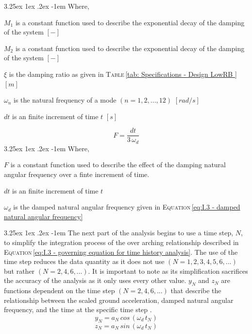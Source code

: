 \documentclass[11pt,a4paper,titlepage]{report}
\makeatletter
\renewcommand\paragraph{\@startsection{paragraph}{5}{\z@}%
  {3.25ex \@plus1ex \@minus.2ex}%
  {-1em}%
  {\normalfont\normalsize\bfseries}}
\makeatother
\begin{document}
\paragraph{}Where,
\begin{itemize}
\begin{small}
    \item $M_1$ is a constant function used to describe the exponential decay of the damping of the system $[-]$
    \item $M_2$ is a constant function used to describe the exponential decay of the damping of the system $[-]$
    \item $\xi$ is the damping ratio as given in \textsc{Table}\,\ref{tab: Specifications - Design LowRB } $[m]$
     \item $\omega_n$ is the natural frequency of a mode $(n=1,2,...,12)$ $[rad/s]$
    \item $dt$ is an finite increment of time $t$ $[s]$
\end{small}
\end{itemize}
\begin{equation}
    F=\dfrac{dt}{3\,\omega_d}
\end{equation}
\paragraph{}Where,
\begin{itemize}
\begin{small}
    \item $F$ is a constant function used to describe the effect of the damping natural angular frequency over a finte increment of time.
    \item $dt$ is an finite increment of time $t$
    \item $\omega_d$ is the damped natural angular frequency given in \textsc{Equation}\,\eqref{eq:I.3 - damped natural angular frequency}
\end{small}
\end{itemize}
\paragraph{}The next part of the analysis begins to use a time step, $N$, to simplify the integration process of the over arching relationship described in \textsc{Equation}\,\eqref{eq:I.3 - governing equation for time history analysis}. The use of the time step reduces the data quantity as it does not use $(N=1,2,3,4,5,6,...)$ but rather $(N=2,4,6,...)$. It is important to note as its simplification sacrifices the accuracy of the analysis as it only uses every other value.  $y_N$ and $z_N$ are functions dependent on the time step $(N=2,4,6,...)$ that describe the relationship between the scaled ground acceleration, damped natural angular frequency, and the time at the specific time step \cite{Tobias}.
\begin{equation}
        y_N=a_N\,cos\,\left(\omega_d\,t_N\right)
        \label{eq:I.3 - yN}
\end{equation}
\begin{equation}
        z_N=a_N\,sin\,\left(\omega_d\,t_N\right)
        \label{eq:I.3 - zN}
\end{equation}
\end{document}
